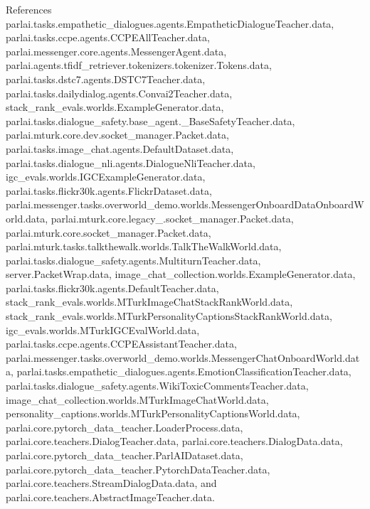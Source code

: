 References parlai.\+tasks.\+empathetic\+\_\+dialogues.\+agents.\+Empathetic\+Dialogue\+Teacher.\+data, parlai.\+tasks.\+ccpe.\+agents.\+C\+C\+P\+E\+All\+Teacher.\+data, parlai.\+messenger.\+core.\+agents.\+Messenger\+Agent.\+data, parlai.\+agents.\+tfidf\+\_\+retriever.\+tokenizers.\+tokenizer.\+Tokens.\+data, parlai.\+tasks.\+dstc7.\+agents.\+D\+S\+T\+C7\+Teacher.\+data, parlai.\+tasks.\+dailydialog.\+agents.\+Convai2\+Teacher.\+data, stack\+\_\+rank\+\_\+evals.\+worlds.\+Example\+Generator.\+data, parlai.\+tasks.\+dialogue\+\_\+safety.\+base\+\_\+agent.\+\_\+\+Base\+Safety\+Teacher.\+data, parlai.\+mturk.\+core.\+dev.\+socket\+\_\+manager.\+Packet.\+data, parlai.\+tasks.\+image\+\_\+chat.\+agents.\+Default\+Dataset.\+data, parlai.\+tasks.\+dialogue\+\_\+nli.\+agents.\+Dialogue\+Nli\+Teacher.\+data, igc\+\_\+evals.\+worlds.\+I\+G\+C\+Example\+Generator.\+data, parlai.\+tasks.\+flickr30k.\+agents.\+Flickr\+Dataset.\+data, parlai.\+messenger.\+tasks.\+overworld\+\_\+demo.\+worlds.\+Messenger\+Onboard\+Data\+Onboard\+World.\+data, parlai.\+mturk.\+core.\+legacy\+\_.\+socket\+\_\+manager.\+Packet.\+data, parlai.\+mturk.\+core.\+socket\+\_\+manager.\+Packet.\+data, parlai.\+mturk.\+tasks.\+talkthewalk.\+worlds.\+Talk\+The\+Walk\+World.\+data, parlai.\+tasks.\+dialogue\+\_\+safety.\+agents.\+Multiturn\+Teacher.\+data, server.\+Packet\+Wrap.\+data, image\+\_\+chat\+\_\+collection.\+worlds.\+Example\+Generator.\+data, parlai.\+tasks.\+flickr30k.\+agents.\+Default\+Teacher.\+data, stack\+\_\+rank\+\_\+evals.\+worlds.\+M\+Turk\+Image\+Chat\+Stack\+Rank\+World.\+data, stack\+\_\+rank\+\_\+evals.\+worlds.\+M\+Turk\+Personality\+Captions\+Stack\+Rank\+World.\+data, igc\+\_\+evals.\+worlds.\+M\+Turk\+I\+G\+C\+Eval\+World.\+data, parlai.\+tasks.\+ccpe.\+agents.\+C\+C\+P\+E\+Assistant\+Teacher.\+data, parlai.\+messenger.\+tasks.\+overworld\+\_\+demo.\+worlds.\+Messenger\+Chat\+Onboard\+World.\+data, parlai.\+tasks.\+empathetic\+\_\+dialogues.\+agents.\+Emotion\+Classification\+Teacher.\+data, parlai.\+tasks.\+dialogue\+\_\+safety.\+agents.\+Wiki\+Toxic\+Comments\+Teacher.\+data, image\+\_\+chat\+\_\+collection.\+worlds.\+M\+Turk\+Image\+Chat\+World.\+data, personality\+\_\+captions.\+worlds.\+M\+Turk\+Personality\+Captions\+World.\+data, parlai.\+core.\+pytorch\+\_\+data\+\_\+teacher.\+Loader\+Process.\+data, parlai.\+core.\+teachers.\+Dialog\+Teacher.\+data, parlai.\+core.\+teachers.\+Dialog\+Data.\+data, parlai.\+core.\+pytorch\+\_\+data\+\_\+teacher.\+Parl\+A\+I\+Dataset.\+data, parlai.\+core.\+pytorch\+\_\+data\+\_\+teacher.\+Pytorch\+Data\+Teacher.\+data, parlai.\+core.\+teachers.\+Stream\+Dialog\+Data.\+data, and parlai.\+core.\+teachers.\+Abstract\+Image\+Teacher.\+data.



